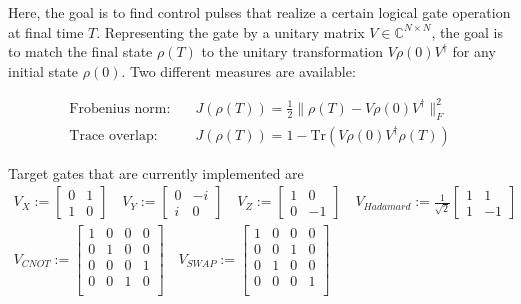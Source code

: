 \documentclass[11pt]{article}
\newcommand{\C}{\mathds{C}}
\begin{document}
Here, the goal is to find control pulses that realize a certain logical gate
operation at final time $T$. Representing the gate by a unitary matrix $V\in
\C^{N\times N}$, the goal is to match the final state $\rho(T)$ to the unitary
transformation $V\rho(0)V^{\dagger}$ for any initial state $\rho(0)$. Two different measures are available:

\begin{align}
 \text{Frobenius norm:} \quad & J(\rho(T)) = \frac{1}{2}\| \rho(T) - V\rho(0)V^{\dagger} \|^2_F  \\
 \text{Trace overlap:} \quad  & J(\rho(T)) = 1 - \mbox{Tr}\left(V\rho(0)V^{\dagger}\rho(T) \right) 
\end{align} 


Target gates that are currently implemented are
\begin{align}
  V_{X} := \begin{bmatrix} 0 & 1 \\ 1 & 0  \end{bmatrix} \quad
  V_{Y} := \begin{bmatrix} 0 & -i \\ i & 0 \end{bmatrix} \quad
  V_{Z} := \begin{bmatrix} 1 & 0 \\ 0 & -1 \end{bmatrix} \quad 
  V_{Hadamard} := \frac{1}{\sqrt{2}} 
           \begin{bmatrix} 1 & 1 \\ 1 & -1 \end{bmatrix} \\
  V_{CNOT} := \begin{bmatrix} 1  & 0 & 0 & 0 \\ 
                               0  & 1 & 0 & 0 \\ 
                               0  & 0 & 0 & 1 \\ 
                               0  & 0 & 1 & 0 \\ 
                \end{bmatrix} \quad 
  V_{SWAP} := \begin{bmatrix}
    1 & 0 & 0 & 0 \\
    0 & 0 & 1 & 0 \\
    0 & 1 & 0 & 0 \\
    0 & 0 & 0 & 1 \\
  \end{bmatrix}
\end{align}
\end{document}
